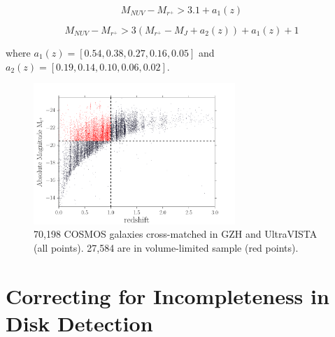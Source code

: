 \documentclass[useAMS,usenatbib]{mn2e}
\begin{document}
\begin{equation}
M_{NUV}-M_{r^{+}} > 3.1 + a_{1}(z)
\end{equation}

\begin{equation}
M_{NUV}-M_{r^{+}} > 3(M_{r^{+}}-M_{J} + a_{2}(z))+ a_{1}(z) + 1  
\end{equation}

where $a_{1}(z) = [0.54,0.38,0.27,0.16,0.05]$ and $a_{2}(z) = [0.19,0.14,0.10,0.06,0.02]$. 
\begin{figure}
\centering
\includegraphics[width=3in]{figures/mag_z_limit.pdf}
\caption{70,198 COSMOS galaxies cross-matched in GZH and UltraVISTA (all points). 27,584 are in volume-limited sample (red points).}
\label{fig:volume_lim}
\end{figure}   

\section{Correcting for Incompleteness in Disk Detection}
\end{document}
